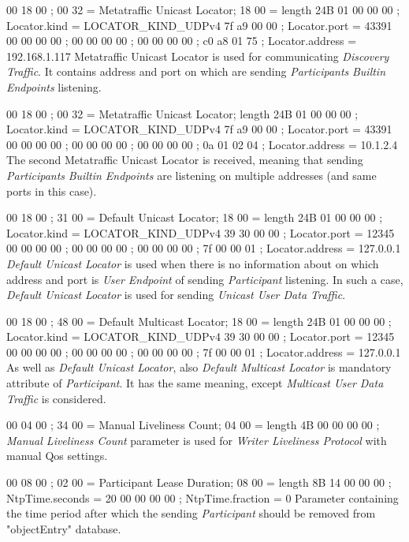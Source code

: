  00 18 00  ; 00 32 = Metatraffic Unicast Locator; 18 00 = length 24B
 01 00 00 00  ; Locator.kind = LOCATOR_KIND_UDPv4
 7f a9 00 00  ; Locator.port = 43391
 00 00 00 00  ;
 00 00 00 00  ;
 00 00 00 00  ;
 c0 a8 01 75  ; Locator.address = 192.168.1.117
\endtt
Metatraffic Unicast Locator is used for communicating {\em Discovery Traffic}. It contains  address and port on which are sending {\em Participants} {\em Builtin Endpoints} listening.

 00 18 00  ; 00 32 = Metatraffic Unicast Locator; length 24B
 01 00 00 00  ; Locator.kind = LOCATOR_KIND_UDPv4
 7f a9 00 00  ; Locator.port = 43391
 00 00 00 00  ;
 00 00 00 00  ;
 00 00 00 00  ;
 0a 01 02 04  ; Locator.address = 10.1.2.4
\endtt
The second Metatraffic Unicast Locator is received, meaning that sending {\em Participants} {\em Builtin Endpoints} are listening on multiple  addresses (and same ports in this case).

 00 18 00  ; 31 00 = Default Unicast Locator; 18 00 = length 24B
 01 00 00 00  ; Locator.kind = LOCATOR_KIND_UDPv4
 39 30 00 00  ; Locator.port = 12345
 00 00 00 00  ;
 00 00 00 00  ;
 00 00 00 00  ;
 7f 00 00 01  ; Locator.address = 127.0.0.1
\endtt
{\em Default Unicast Locator} is used when there is no information about on which  address and port is {\em User Endpoint} of sending {\em Participant} listening. In such a case, {\em Default Unicast Locator} is used for sending {\em Unicast User Data Traffic}.

 00 18 00  ; 48 00 = Default Multicast Locator; 18 00 = length 24B
 01 00 00 00  ; Locator.kind = LOCATOR_KIND_UDPv4
 39 30 00 00  ; Locator.port = 12345
 00 00 00 00  ;
 00 00 00 00  ;
 00 00 00 00  ;
 7f 00 00 01  ; Locator.address = 127.0.0.1
\endtt
As well as {\em Default Unicast Locator}, also {\em Default Multicast Locator} is mandatory attribute of {\em Participant}. It has the same meaning, except {\em Multicast User Data Traffic} is considered. 

 00 04 00  ; 34 00 = Manual Liveliness Count; 04 00 = length 4B
 00 00 00 00  ;
\endtt
{\em Manual Liveliness Count} parameter is used for {\em Writer Liveliness Protocol} with manual Qos settings.

 00 08 00  ; 02 00 = Participant Lease Duration; 08 00 = length 8B
 14 00 00 00  ; NtpTime.seconds = 20
 00 00 00 00  ; NtpTime.fraction = 0
\endtt
Parameter containing the time period after which the sending {\em Participant} should be removed from "objectEntry" database.

